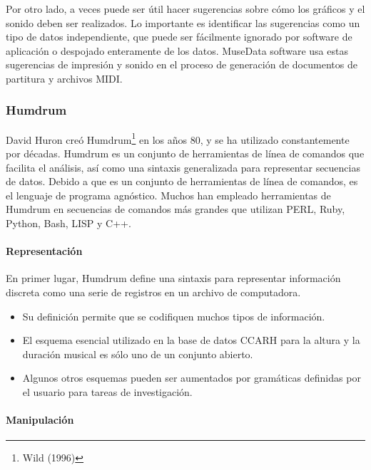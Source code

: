 \documentclass[]{article}
\let\oldparagraph\paragraph
\renewcommand{\paragraph}[1]{\oldparagraph{#1}\mbox{}}
\begin{document}
Por otro lado, a veces puede ser útil hacer sugerencias sobre cómo los
gráficos y el sonido deben ser realizados. Lo importante es identificar
las sugerencias como un tipo de datos independiente, que puede ser
fácilmente ignorado por software de aplicación o despojado enteramente
de los datos. MuseData software usa estas sugerencias de impresión y
sonido en el proceso de generación de documentos de partitura y archivos
MIDI.

\hypertarget{humdrum}{%
\subsubsection{Humdrum}\label{humdrum}}

David Huron creó Humdrum\footnote{Wild (1996)} en los años 80, y se ha
utilizado constantemente por décadas. Humdrum es un conjunto de
herramientas de línea de comandos que facilita el análisis, así como una
sintaxis generalizada para representar secuencias de datos. Debido a que
es un conjunto de herramientas de línea de comandos, es el lenguaje de
programa agnóstico. Muchos han empleado herramientas de Humdrum en
secuencias de comandos más grandes que utilizan PERL, Ruby, Python,
Bash, LISP y C++.

\hypertarget{representaciuxf3n}{%
\paragraph{Representación}\label{representaciuxf3n}}

En primer lugar, Humdrum define una sintaxis para representar
información discreta como una serie de registros en un archivo de
computadora.

\begin{itemize}
\item
  Su definición permite que se codifiquen muchos tipos de información.
\item
  El esquema esencial utilizado en la base de datos CCARH para la altura
  y la duración musical es sólo uno de un conjunto abierto.
\item
  Algunos otros esquemas pueden ser aumentados por gramáticas definidas
  por el usuario para tareas de investigación.
\end{itemize}

\hypertarget{manipulaciuxf3n}{%
\paragraph{Manipulación}\label{manipulaciuxf3n}}
\end{document}
